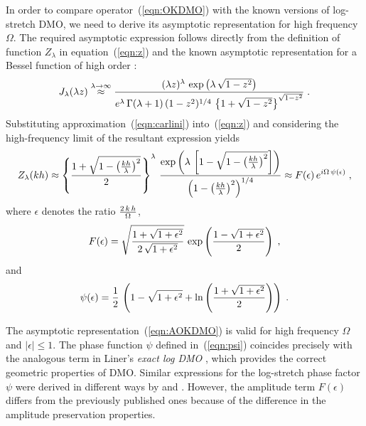In order to compare operator~(\ref{eqn:OKDMO}) with the known versions
of log-stretch DMO, we need to derive its asymptotic representation
for high frequency $\Omega$. The required asymptotic expression
follows directly from the definition of function $Z_{\lambda}$ in
equation~(\ref{eqn:z}) and the known asymptotic representation for a Bessel
function of high order \cite[]{watson}:
\begin{equation}
J_{\lambda}(\lambda z) \stackrel{\lambda \rightarrow \infty}{\approx} 
{{(\lambda z)^{\lambda}\,\exp\left(\lambda\,\sqrt{1-z^2}\right)} \over
{e^{\lambda}\,\Gamma(\lambda+1)\,(1-z^2)^{1/4}\,
\left\{1+\sqrt{1-z^2}\right\}^{\sqrt{1-z^2}}}}\;.
\label{eqn:carlini}
\end{equation}
Substituting approximation~(\ref{eqn:carlini}) into~(\ref{eqn:z}) and
considering the high-frequency limit of the resultant expression
yields
\begin{equation}
Z_{\lambda}(kh) \approx 
\left\{{1+\sqrt{1-\left(kh \over \lambda\right)^2}} \over
2\right\}^{\lambda}\, 
{{\exp\left(\lambda\,\left[1 - \sqrt{1-\left(kh \over
\lambda\right)^2}\right]\right)} \over 
\left(1-\left(kh \over \lambda\right)^2\right)^{1/4}} \approx
{F(\epsilon)\,e^{i\Omega\,\psi(\epsilon)}}\;,
\label{eqn:AOKDMO}
\end{equation}
where $\epsilon$ denotes the ratio ${2\,k\,h} \over
\Omega$,
\begin{equation}
F(\epsilon)=\sqrt{{1+\sqrt{1+\epsilon^2}} \over
{2\,\sqrt{1+\epsilon^2}}}\,
\exp\left({1-\sqrt{1+\epsilon^2}} \over 2\right)\;,
\label{eqn:F}
\end{equation}
and
\begin{equation}
\psi(\epsilon)={1 \over 2}\,\left(1 - \sqrt{1+\epsilon^2} +
\ln\left({1 + \sqrt{1+\epsilon^2}} \over 2\right)\right)\;.
\label{eqn:psi}
\end{equation}

The asymptotic representation~(\ref{eqn:AOKDMO}) is valid for high
frequency $\Omega$ and $|\epsilon| \leq 1$. The
phase function $\psi$ defined in~(\ref{eqn:psi}) coincides precisely
with the analogous term in Liner's \emph{exact log DMO}
\cite[]{GEO55-05-05950607}, which provides the correct
geometric properties of DMO. Similar expressions for the log-stretch
phase factor $\psi$ were derived in different ways by
\cite{GEO61-03-08150820} and \cite{GEO61-04-11031114}.
However, the amplitude term $F(\epsilon)$ differs from the previously
published ones because of the difference in the amplitude preservation
properties.
  
